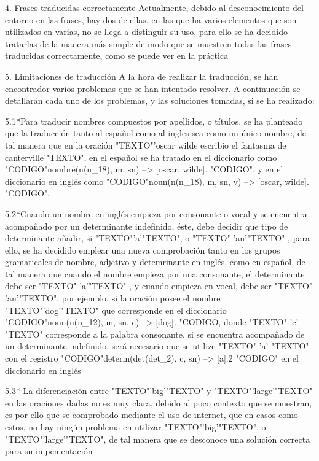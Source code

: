 ﻿\documentclass[a4paper]{article}
\begin{document}
4. Frases traducidas correctamente
   Actualmente, debido al desconocimiento del entorno en las frases, hay dos de ellas, en las que ha    varios elementos que son utilizados en varias, no se llega a distinguir su uso, para ello se ha    decidido tratarlas de la manera más simple de modo que se muestren todas las frases traducidas    correctamente, como se puede ver en la práctica

5. Limitaciones de traducción 
   A la hora de realizar la traducción, se han encontrador varios problemas que se han intentado resolver. A continuación se detallarán cada uno de los problemas, y las soluciones tomadas, si se ha realizado:
   
 5.1*Para traducir nombres compuestos por apellidos, o títulos, se ha planteado que la traducción    tanto al español como al ingles sea como un único nombre, de tal manera que en la oración    "TEXTO"'oscar wilde escribio el fantasma de canterville'"TEXTO", en el español se ha tratado en el    diccionario como "CODIGO"nombre(n(n_18), m, sn) --> [oscar, wilde]. "CODIGO", y en el diccionario    en inglés como "CODIGO"noun(n(n_18), m, sn, v) --> [oscar, wilde]. "CODIGO".
   
 5.2*Cuando un nombre en inglés empieza por consonante o vocal y se encuentra acompañado por un    determinante indefinido, éste, debe decidir que tipo de determinante añadir, si "TEXTO"'a'"TEXTO",    o "TEXTO" 'an'"TEXTO" , para ello, se ha decidido emplear una nueva comprobación tanto en los       grupos gramaticales de nombre, adjetivo y detemrinante en inglés, como en español, de tal manera      que cuando el nombre empieza por una consonante, el determinante debe ser "TEXTO" 'a'"TEXTO" , y    cuando empieza en vocal, debe ser "TEXTO" 'an'"TEXTO", por ejemplo, si la oración posee el nombre     "TEXTO"'dog'"TEXTO" que corresponde en el diccionario "CODIGO"noun(n(n_12), m, sn, c) --> [dog].     "CODIGO, donde "TEXTO" 'c' "TEXTO" corresponde a la palabra consonante, si se encuentra acompañado     de un determinante indefinido, será necesario que se utilize "TEXTO" 'a' "TEXTO" con el registro     "CODIGO"determ(det(det_2), c, sn) --> [a].2 "CODIGO" en el diccionario en inglés
  
 5.3* La diferenciación entre "TEXTO"'big'"TEXTO" y "TEXTO"'large'"TEXTO" en las oraciones dadas no es    muy clara, debido al poco contexto que se muestran, es por ello que se comprobado mediante el uso    de internet, que en casos como estos, no hay ningún problema en utilizar "TEXTO"'big'"TEXTO", o      "TEXTO"'large'"TEXTO", de tal manera que se desconoce una solución correcta para su impementación
  
\end{document}
